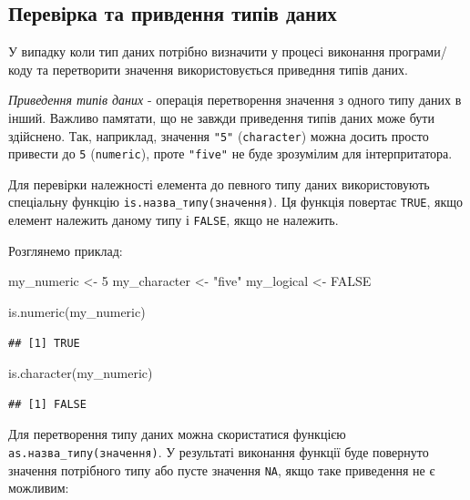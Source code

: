 \documentclass[
]{book}
\newenvironment{Shaded}{\begin{snugshade}}{\end{snugshade}}
\newcommand{\ConstantTok}[1]{\textcolor[rgb]{0.00,0.00,0.00}{#1}}
\newcommand{\DecValTok}[1]{\textcolor[rgb]{0.00,0.00,0.81}{#1}}
\newcommand{\FunctionTok}[1]{\textcolor[rgb]{0.00,0.00,0.00}{#1}}
\newcommand{\NormalTok}[1]{#1}
\newcommand{\OtherTok}[1]{\textcolor[rgb]{0.56,0.35,0.01}{#1}}
\newcommand{\StringTok}[1]{\textcolor[rgb]{0.31,0.60,0.02}{#1}}
\begin{document}
\hypertarget{chapter222}{%
\subsection{Перевірка та привдення типів даних}\label{chapter222}}

У випадку коли тип даних потрібно визначити у процесі виконання програми/коду та перетворити значення використовується приведння типів даних.

\emph{Приведення типів даних} - операція перетворення значення з одного типу даних в інший. Важливо памятати, що не завжди приведення типів даних може бути здійснено. Так, наприклад, значення \texttt{"5"} (\texttt{character}) можна досить просто привести до \texttt{5} (\texttt{numeric}), проте \texttt{"five"} не буде зрозумілим для інтерпритатора.

Для перевірки належності елемента до певного типу даних використовують спеціальну функцію \texttt{is.назва\_типу(значення)}. Ця функція повертає \texttt{TRUE}, якщо елемент належить даному типу і \texttt{FALSE}, якщо не належить.

Розглянемо приклад:

\begin{Shaded}
\begin{Highlighting}[]
\NormalTok{my\_numeric }\OtherTok{\textless{}{-}} \DecValTok{5}
\NormalTok{my\_character }\OtherTok{\textless{}{-}} \StringTok{"five"}
\NormalTok{my\_logical }\OtherTok{\textless{}{-}} \ConstantTok{FALSE}

\FunctionTok{is.numeric}\NormalTok{(my\_numeric)}
\end{Highlighting}
\end{Shaded}

\begin{verbatim}
## [1] TRUE
\end{verbatim}

\begin{Shaded}
\begin{Highlighting}[]
\FunctionTok{is.character}\NormalTok{(my\_numeric)}
\end{Highlighting}
\end{Shaded}

\begin{verbatim}
## [1] FALSE
\end{verbatim}

Для перетворення типу даних можна скористатися функцією \texttt{as.назва\_типу(значення)}. У результаті виконання функції буде повернуто значення потрібного типу або пусте значення \texttt{NA}, якщо таке приведення не є можливим:
\end{document}
